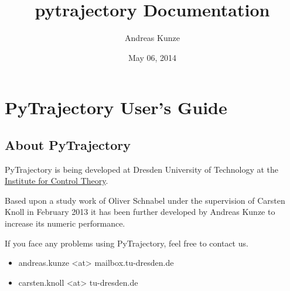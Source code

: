 \documentclass[letterpaper,10pt,english]{sphinxmanual}
\title{pytrajectory Documentation}
\date{May 06, 2014}
\author{Andreas Kunze}
\begin{document}
\maketitle
\tableofcontents
{}\label{index::doc}



\chapter{PyTrajectory User's Guide}
\label{guide/index:pytrajectory-user-s-guide}\label{guide/index:welcome-to-pytrajectory-s-documentation}\label{guide/index::doc}

\section{About PyTrajectory}
\label{guide/about:about-pytrajectory}\label{guide/about::doc}
PyTrajectory is being developed at Dresden University of Technology at the
\href{http://www.et.tu-dresden.de/rst/}{Institute for Control Theory}.

Based upon a study work of Oliver Schnabel under the supervision of Carsten Knoll in February 2013
it has been further developed by Andreas Kunze to increase its numeric performance.

If you face any problems using PyTrajectory, feel free to contact us.
\begin{itemize}
\item {} 
andreas.kunze \textless{}at\textgreater{} mailbox.tu-dresden.de

\item {} 
carsten.knoll \textless{}at\textgreater{} tu-dresden.de

\end{itemize}
\end{document}
